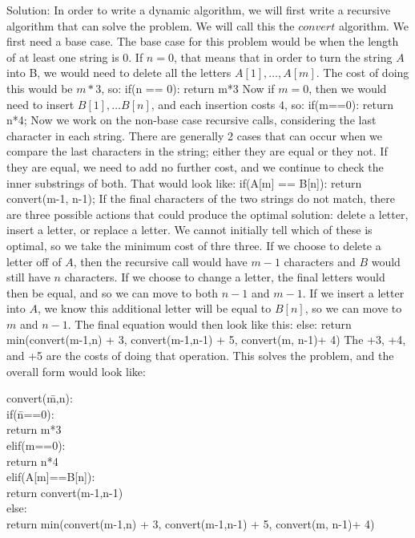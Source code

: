 \documentclass{article}
\begin{document}
\begin{enumerate}
Solution: In order to write a dynamic algorithm, we will first write a recursive algorithm that can solve the problem. We will call this the $convert$ algorithm. 
\newline
\newline We first need a base case. The base case for this problem would be when the length of at least one string is 0. If $n=0$, that means that in order to turn the string $A$ into B, we would need to delete all the letters $A[1],\ldots ,A[m]$. The cost of doing this would be $m * 3$, so:
\newline if(n == 0):
 return m*3
\newline
Now if $m=0$, then we would need to insert $B[1],\ldots B[n]$, and each insertion costs $4$, so:
\newline
if(m==0):
 return n*4;
\newline
\newline Now we work on the non-base case recursive calls, considering the last character in each string. There are generally 2 cases that can occur when we compare the last characters in the string; either they are equal or they not. If they are equal, we need to add no further cost, and we continue to check the inner substrings of both. That would look like: 
\newline if(A[m] == B[n]):
 return convert(m-1, n-1);
\newline
\newline If the final characters of the two strings do not match, there are three possible actions that could produce the optimal solution: delete a letter, insert a letter, or replace a letter. We cannot initially tell which of these is optimal, so we take the minimum cost of thre three. If we choose to delete a letter off of $A$, then the recursive call would have $m-1$ characters and $B$ would still have $n$ characters. If we choose to change a letter, the final letters would then be equal, and so we can move to both $n-1$ and $m-1$. If we insert a letter into $A$, we know this additional letter will be equal to $B[n]$, so we can move to $m$  and $n-1$. The final equation would then look like this:
\newline else:
 return min(convert(m-1,n) + 3, convert(m-1,n-1) + 5, convert(m, n-1)+ 4)
\newline
\newline
The +3, +4, and +5 are the costs of doing that operation. This solves the problem, and the overall form would look like:
\begin{tabbing}
convert(\= m,n):\\
\>if(\=n==0):\\
\>\>return m*3\\
\>elif(m==0):\\
\>\>return n*4\\
\>elif(A[m]==B[n]):\\
\>\>return convert(m-1,n-1)\\
\>else:\\
\>\>return min(convert(m-1,n) + 3, convert(m-1,n-1) + 5, convert(m, n-1)+ 4)
\end{tabbing}


\end{enumerate}
\end{document}
